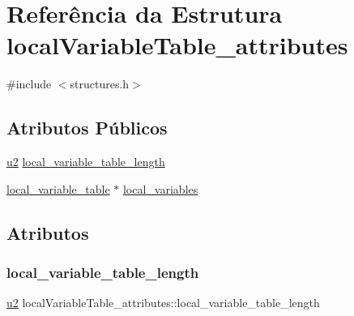 \hypertarget{structlocalVariableTable__attributes}{}\section{Referência da Estrutura local\+Variable\+Table\+\_\+attributes}
\label{structlocalVariableTable__attributes}


{\ttfamily \#include $<$structures.\+h$>$}

\subsection*{Atributos Públicos}
\begin{DoxyCompactItemize}
\item 
\hyperlink{lista__operandos_8h_a732cde1300aafb73b0ea6c2558a7a54f}{u2} \hyperlink{structlocalVariableTable__attributes_a3ae381679f6b069984bfec2618cc40e4}{local\+\_\+variable\+\_\+table\+\_\+length}
\item 
\hyperlink{structlocal__variable__table}{local\+\_\+variable\+\_\+table} $\ast$ \hyperlink{structlocalVariableTable__attributes_a78911369e8a4c58d93f579613144a8c2}{local\+\_\+variables}
\end{DoxyCompactItemize}


\subsection{Atributos}
\mbox{\label{structlocalVariableTable__attributes_a3ae381679f6b069984bfec2618cc40e4}} 
\subsubsection{\texorpdfstring{local\+\_\+variable\+\_\+table\+\_\+length}{local\_variable\_table\_length}}
{\footnotesize\ttfamily \hyperlink{lista__operandos_8h_a732cde1300aafb73b0ea6c2558a7a54f}{u2} local\+Variable\+Table\+\_\+attributes\+::local\+\_\+variable\+\_\+table\+\_\+length}

\mbox{\label{structlocalVariableTable__attributes_a78911369e8a4c58d93f579613144a8c2}} 
